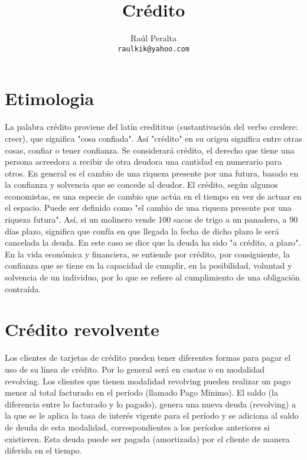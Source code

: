 \documentclass{article}
\title{Crédito}
\author{Raúl Peralta\\
\texttt{raulkik@yahoo.com}}
\begin{document}
\section{Etimologia}
La palabra crédito proviene del latín credititus (sustantivación del verbo credere: creer), que significa "cosa confiada". Así "crédito" en su origen significa entre otras cosas, confiar o tener confianza. Se considerará crédito, el derecho que tiene una persona acreedora a recibir de otra deudora una cantidad en numerario para otros. En general es el cambio de una riqueza presente por una futura, basado en la confianza y solvencia que se concede al deudor. El crédito, según algunos economistas, es una especie de cambio que actúa en el tiempo en vez de actuar en el espacio. Puede ser definido como "el cambio de una riqueza presente por una riqueza futura". Así, si un molinero vende 100 sacos de trigo a un panadero, a 90 días plazo, significa que confía en que llegada la fecha de dicho plazo le será cancelada la deuda. En este caso se dice que la deuda ha sido "a crédito, a plazo". En la vida económica y financiera, se entiende por crédito, por consiguiente, la confianza que se tiene en la capacidad de cumplir, en la posibilidad, voluntad y solvencia de un individuo, por lo que se refiere al cumplimiento de una obligación contraída.

\section{Crédito revolvente}
Los clientes de tarjetas de crédito pueden tener diferentes formas para pagar el uso de su línea de crédito. Por lo general será en cuotas o en modalidad revolving. Los clientes que tienen modalidad revolving pueden realizar un pago menor al total facturado en el período (llamado Pago Mínimo). El saldo (la diferencia entre lo facturado y lo pagado), genera una nueva deuda (revolving) a la que se le aplica la tasa de interés vigente para el período y se adiciona al saldo de deuda de esta modalidad, correspondientes a los períodos anteriores si existieren. Esta deuda puede ser pagada (amortizada) por el cliente de manera diferida en el tiempo.
\end{document}
